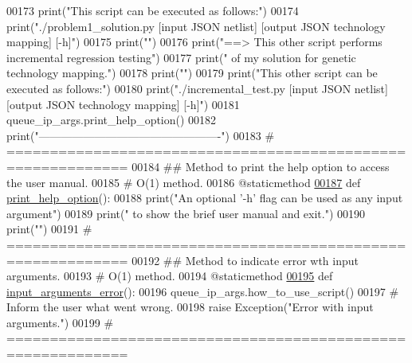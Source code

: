 \begin{DoxyCode}
00173         print(\textcolor{stringliteral}{"This script can be executed as follows:"})
00174         print(\textcolor{stringliteral}{"./problem1\_solution.py [input JSON netlist] [output JSON technology mapping] [-h]"})
00175         print(\textcolor{stringliteral}{""})
00176         print(\textcolor{stringliteral}{"==>  This other script performs incremental regression testing"})
00177         print(\textcolor{stringliteral}{" of my solution for genetic technology mapping."})
00178         print(\textcolor{stringliteral}{""})
00179         print(\textcolor{stringliteral}{"This other script can be executed as follows:"})
00180         print(\textcolor{stringliteral}{"./incremental\_test.py [input JSON netlist] [output JSON technology mapping] [-h]"})
00181         queue\_ip\_args.print\_help\_option()
00182         print(\textcolor{stringliteral}{"-------------------------------------------------"})
00183     \textcolor{comment}{# ============================================================}
00184     \textcolor{comment}{##  Method to print the help option to access the user manual.}
00185     \textcolor{comment}{#   O(1) method.}
00186     @staticmethod
\hypertarget{queue__ip__arguments_8py_source_l00187}{}\hyperlink{classutilities_1_1queue__ip__arguments_1_1queue__ip__args_a28c79307da87e28e9ac3467290fd5738}{00187}     \textcolor{keyword}{def }\hyperlink{classutilities_1_1queue__ip__arguments_1_1queue__ip__args_a28c79307da87e28e9ac3467290fd5738}{print\_help\_option}():
00188         print(\textcolor{stringliteral}{"An optional '-h' flag can be used as any input argument"})
00189         print(\textcolor{stringliteral}{" to show the brief user manual and exit."})
00190         print(\textcolor{stringliteral}{""})
00191     \textcolor{comment}{# ============================================================}
00192     \textcolor{comment}{##  Method to indicate error wth input arguments.}
00193     \textcolor{comment}{#   O(1) method.}
00194     @staticmethod
\hypertarget{queue__ip__arguments_8py_source_l00195}{}\hyperlink{classutilities_1_1queue__ip__arguments_1_1queue__ip__args_afdfbfffba8afb5e786283dd22d856e93}{00195}     \textcolor{keyword}{def }\hyperlink{classutilities_1_1queue__ip__arguments_1_1queue__ip__args_afdfbfffba8afb5e786283dd22d856e93}{input\_arguments\_error}():
00196         queue\_ip\_args.how\_to\_use\_script()
00197         \textcolor{comment}{# Inform the user what went wrong.}
00198         \textcolor{keywordflow}{raise} Exception(\textcolor{stringliteral}{"Error with input arguments."})
00199     \textcolor{comment}{# ============================================================}

\end{DoxyCode}
